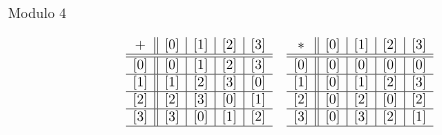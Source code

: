\documentclass[handout]{ximera}
\begin{document}
\begin{br}
\begin{solution}
\begin{description}
            \item[Modulo $4$] 
                \begin{align*}
                & \begin{array}{c||c|c|c|c}
                    + & [0] & [1] & [2] & [3]\\ \hline\hline
                    [0] & [0] & [1] & [2] & [3]\\ \hline
                    [1] & [1] & [2] & [3] & [0] \\ \hline
                    [2] & [2] & [3] & [0] & [1]\\ \hline
                    [3] & [3] & [0] & [1] & [2]\\ \hline
                \end{array}
                & \begin{array}{c||c|c|c|c}
                    \ast & [0] & [1] & [2] & [3]\\ \hline\hline
                    [0] & [0] & [0] & [0] & [0]\\ \hline
                    [1] & [0] & [1] & [2] & [3]\\ \hline
                    [2] & [0] & [2] & [0] & [2]\\ \hline
                    [3] & [0] & [3] & [2] & [1]\\ \hline
                \end{array}
                \end{align*}
        

\end{description}
\end{solution}
\end{br}
\end{document}
